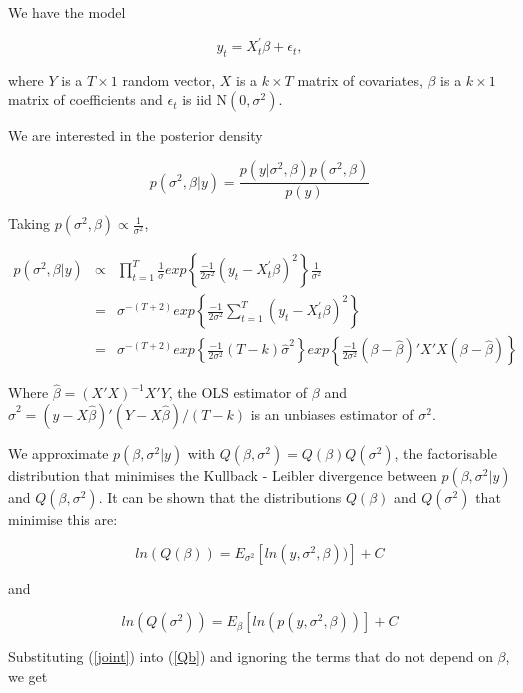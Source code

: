 \documentclass{article}
\begin{document}


We have the model

$$y_{t} = X^{'}_{t}\beta + \epsilon_{t},$$

where $Y$ is a $T \times 1$ random vector, $X$ is a $k \times T$ matrix of covariates, $\beta$ is a $k \times 1$ matrix of coefficients and $\epsilon_{t}$ is iid N$(0,\sigma^2).$

We are interested in the posterior density

$$p(\sigma^2, \beta | y) = \frac{p(y | \sigma^2, \beta)p(\sigma^2, \beta)}{p(y)}$$

Taking $p(\sigma^2, \beta) \propto \frac{1}{\sigma^2}$, 

\begin{eqnarray}
\label{joint}
p(\sigma^2, \beta | y) & \propto & \prod_{t=1}^{T} \frac{1}{\sigma} exp \left\{\frac{-1}{2 \sigma^2} (y_{t}-X^{'}_{t}\beta)^2 \right\} \frac{1}{\sigma^2} \nonumber \\
& = & \sigma^{-(T+2)} exp \left\{ \frac{-1}{2\sigma^2} \sum_{t=1}^{T} (y_{t}-X^{'}_{t}\beta)^2 \right\} \nonumber \\
& = & \sigma^{-(T+2)} exp \left\{ \frac{-1}{2\sigma^2}(T-k)\hat{\sigma}^2 \right\} exp \left\{ \frac{-1}{2\sigma^2} (\beta-\hat{\beta})'X'X(\beta-\hat{\beta})\right\} 
\end{eqnarray}

Where $\hat{\beta} = (X'X)^{-1}X'Y$, the OLS estimator of $\beta$ and $\hat{\sigma}^2 = (y-X\hat{\beta})'(Y-X\hat{\beta})/(T-k)$ is an unbiases estimator of $\sigma^2$.


We approximate $p(\beta, \sigma^2 | y)$ with $Q(\beta, \sigma^2) = Q(\beta)Q(\sigma^2)$, the factorisable distribution that minimises the Kullback - Leibler divergence between $p(\beta, \sigma^2 | y)$ and $Q(\beta, \sigma^2)$. It can be shown that the distributions $Q(\beta)$ and $Q(\sigma^2)$ that minimise this are: 

\begin{equation}
\label{Qb}
ln(Q(\beta)) = E_{\sigma^2}\left[ ln(y, \sigma^2, \beta))\right] + C
\end{equation}

and

\begin{equation}
\label{Qs}
ln(Q(\sigma^2)) = E_{\beta}\left[ ln(p(y, \sigma^2, \beta))\right] + C
\end{equation}

Substituting (\ref{joint}) into (\ref{Qb}) and ignoring the terms that do not depend on $\beta$, we get
\end{document}
